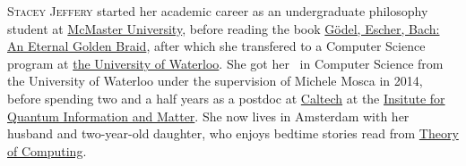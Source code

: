 \documentclass{toc}
\begin{document}
%
%
%
%
%
%
%
%
%
%
%
%
%
%
%
%
%
%
%
%
\begin{tocaboutauthors}
\begin{tocabout}[jeffery]  %
  \textsc{Stacey Jeffery} started her academic career as an undergraduate philosophy student at \href{http://mcmaster.ca}{McMaster University}, before reading the book \href{https://en.wikipedia.org/wiki/G\%C3\%B6del,_Escher,_Bach}{G\"odel, Escher, Bach: An Eternal Golden Braid}, 
after which she transfered to a Computer Science program at \href{http://uwaterloo.ca}{the University of Waterloo}. She got her \phd\ in Computer Science from the University of Waterloo under the supervision of Michele Mosca in 2014, before spending two and a half years as a postdoc at \href{http://caltech.edu}{Caltech} at the \href{https://iqim.caltech.edu/}{Insitute for Quantum Information and Matter}. She now lives in Amsterdam with her husband and two-year-old daughter, who enjoys bedtime stories read from 
\href{http://theoryofcomputing.org}{\textsf{Theory of Computing}}.
%
\end{tocabout}
\end{tocaboutauthors}
\end{document}
